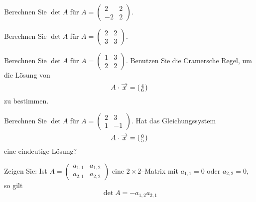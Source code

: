 \bigbreak

\begin{aufgabe} Berechnen Sie $\det{A}$ für $A = \left( \begin{smallmatrix} 2 & 2 \\ 
-2 & 2 \end{smallmatrix} \right)$. 
\end{aufgabe}

\begin{aufgabe} Berechnen Sie $\det{A}$ für $A = \left( \begin{smallmatrix} 2 & 2 \\ 
3 & 3 \end{smallmatrix} \right)$. 
\end{aufgabe}


\begin{aufgabe} Berechnen Sie $\det{A}$ für $A = \left( \begin{smallmatrix} 1 & 3 \\ 
2 & 2 \end{smallmatrix} \right)$. Benutzen Sie die Cramersche Regel, um die Lösung von 
  $$ A \cdot \overrightarrow{x} =  \left( \begin{smallmatrix} 4 \\ 
     6 \end{smallmatrix} \right) $$
zu bestimmen. 
\end{aufgabe}

\begin{aufgabe} Berechnen Sie $\det{A}$ für $A = \left( \begin{smallmatrix} 2 & 3 \\ 
1 & -1 \end{smallmatrix} \right)$. Hat das Gleichungssystem 
  $$ A \cdot \overrightarrow{x} =  \left( \begin{smallmatrix} 0 \\ 
     5 \end{smallmatrix} \right) $$
eine eindeutige Lösung? 
\end{aufgabe}

\begin{aufgabe} Zeigen Sie: Ist $A = \left( \begin{smallmatrix} a_{1,1} & a_{1,2} \\ a_{2,1} & a_{2,2}
\end{smallmatrix} \right)$ eine $2 \times 2$--Matrix mit $a_{1,1} = 0$ oder $a_{2,2} = 0$, so gilt
  $$ \det{A} = - a_{1,2} a_{2,1} $$
\end{aufgabe}

